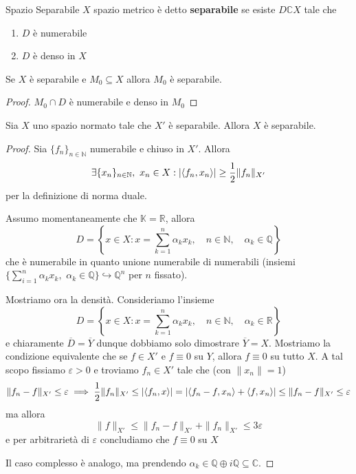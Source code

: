 \begin{definition}{Spazio Separabile}
    \(X\) spazio metrico è detto \textbf{separabile} se esiste \(D \mathbb{C} X\) tale che
\begin{enumerate}[label = \arabic*.]
    \item \(D\) è numerabile
    \item \(D\) è denso in \(X\) 
\end{enumerate}
\end{definition}
\begin{proposition}{}
    Se \(X\) è separabile e \(M_{0} \subseteq X \) allora \(M_{0}\) è
    separabile.
\end{proposition}
\begin{proof}{}
    \(M_{0} \cap D\) è numerabile e denso in \(M_{0}\) 
\end{proof}
\begin{theorem}{}
    Sia \(X\) uno spazio normato tale che \(X'\) è separabile. Allora \(X\) è
    separabile.
\end{theorem}
\begin{proof}{}
    Sia \(\{f_{n}\}_{n \in \mathbb{N}} \) numerabile e chiuso in \(X'\). Allora
    \[
    \exists \{x_{n}\}_{n \in \mathbb{N}}, \,\, x_{n} \in X : |{\left\langle f_{n}, x_{n}\right\rangle} | \ge \frac{1}{2}\|f_{n}\|_{X'} 
    \]
    per la definizione di norma duale.

    Assumo momentaneamente che \(\mathbb{K} = \mathbb{R}\), allora
    \[
      D = \left\{x \in X : x=\sum_{k=1}^{n} \alpha_k x_k , \quad n \in \mathbb{N}, \quad \alpha_k \in \mathbb{Q}\right\} 
    \]
    che è numerabile in quanto unione numerabile di numerabili (insiemi \\\(\{\sum_{i=1}^{n} \alpha_k x_k , \,\, \alpha_k \in \mathbb{Q}  \} \hookrightarrow \mathbb{Q}^{n} \) per \(n\) fissato).

    Mostriamo ora la densità. Consideriamo l'insieme 
    \[
      D = \left\{x \in X : x=\sum_{k=1}^{n} \alpha_k x_k , \quad n \in \mathbb{N}, \quad \alpha_k \in \mathbb{R}\right\} 
    \]
    e chiaramente \(\overline{D} = \overline{Y}\) dunque dobbiamo solo
    dimostrare \(\overline{Y} = X\). Mostriamo la condizione equivalente che se \(f \in X'\) e
    \(f \equiv 0 \) su \(Y\), allora \(f \equiv 0\) su tutto \(X\). A tal scopo
    fissiamo \(\varepsilon > 0\) e troviamo \(f_{n} \in X'\) tale che (con \(\|x_{n}\| = 1\))
    \[
    \|f_{n} - f\|_{X'} \le \varepsilon \implies \frac{1}{2}\|f_{n}\|_{X'}  \le |
    {\left\langle f_{n}, x\right\rangle} | = | {\left\langle f_{n}-f,x_{n}\right\rangle} + {\left\langle f, x_{n}\right\rangle} | \le \|f_{n} -
    f\|_{X'} \le \varepsilon
    \]
    ma allora
    \[
      \|f\|_{X'}  \le \|f_{n}-f\|_{X'} + \|f_{n}\|_{X'} \le 3\varepsilon
    \]
    e per arbitrarietà di \(\varepsilon\) concludiamo che \(f \equiv 0\) su \(X\) 

    Il caso complesso è analogo, ma prendendo \(\alpha_k \in \mathbb{Q} \oplus i \mathbb{Q} \subseteq \mathbb{C}\).
\end{proof}

